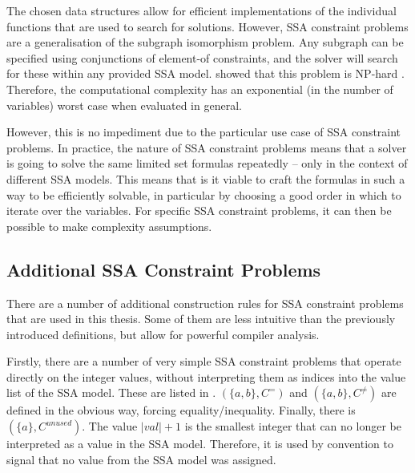     The chosen data structures allow for efficient implementations
    of the individual functions that are used to search for solutions.
    However, SSA constraint problems are a generalisation of the subgraph
    isomorphism problem.
    Any subgraph can be specified using conjunctions of element-of constraints,
    and the solver will search for these within any provided SSA model.
    \citet{Cook:1971:CTP:800157.805047} showed that this problem is NP-hard
    \citep{Leeuwen:1990:HTC:574797}.
    Therefore, the computational complexity has an exponential
    (in the number of variables) worst case when evaluated in general.

    However, this is no impediment due to the particular use case of
    SSA constraint problems.
    In practice, the nature of SSA constraint problems means that a solver is
    going to solve the same limited set formulas repeatedly -- only in the
    context of different SSA models.
    This means that is it viable to craft the formulas in such a way to be
    efficiently solvable, in particular by choosing a good order in which to
    iterate over the variables.
    For specific SSA constraint problems, it can then be possible to make
    complexity assumptions.

\subsection{Additional SSA Constraint Problems}

    There are a number of additional construction rules for SSA constraint
    problems that are used in this thesis.
    Some of them are less intuitive than the previously introduced definitions,
    but allow for powerful compiler analysis.

    Firstly, there are a number of very simple SSA constraint problems that
    operate directly on the integer values, without interpreting them as indices
    into the value list of the SSA model.
    These are listed in .
    $(\{a,b\}, C^=)$ and $(\{a,b\}, C^{\neq})$ are defined in the
    obvious way, forcing equality/inequality.
    Finally, there is $(\{a\}, C^{unused})$.
    The value $|val|+1$ is the smallest integer that can no longer be
    interpreted as a value in the SSA model.
    Therefore, it is used by convention to signal that no value from the SSA
    model was assigned.

